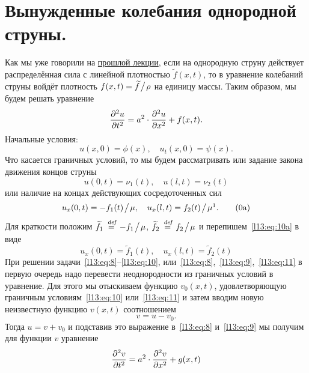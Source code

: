 \section{Вынужденные колебания однородной струны.}
\label{lecture13section2}
Как мы уже говорили на \hyperref[lecture12]{прошлой лекции}, если на однородную струну действует распределённая сила с линейной плотностью $\widetilde{f}(x,t)$, то в уравнение колебаний струны войдёт плотность $f(x,t)=\widetilde{f}\!\bigm/\!\rho$ на единицу массы. Таким образом, мы будем решать уравнение 
\begin{equation}\label{l13:eq:8}
	\frac{\partial^2u}{\partial t^2}=a^2\cdot\frac{\partial^2u}{\partial x^2}+f(x,t).
\end{equation}
Начальные условия:
\begin{equation}\label{l13:eq:9}
	 u(x,0)=\phi(x),\quad u_t(x,0)=\psi(x).
\end{equation}
Что касается граничных условий, то мы будем рассматривать или задание закона движения концов струны
\begin{equation}\label{l13:eq:10}
	 u(0,t)=\nu_1(t),\quad u(l,t)=\nu_2(t)
\end{equation}
или наличие на концах действующих сосредоточенных сил
\begin{equation}\label{l13:eq:10a}
	 u_x(0,t)=-f_1(t)\!\bigm/\!\mu,\quad u_x(l,t)=f_2(t)\!\bigm/\!\mu\footnotemark{}.\tag{\theequation a}
\end{equation} Для краткости положим $\widetilde{f}_1\stackrel{\hspace{0.09 cm}de\!f}{=} -f_1\!\bigm/\!\mu$, $\widetilde{f}_2\stackrel{\hspace{0.09 cm}de\!f}{=} f_2\!\bigm/\!\mu$ и перепишем~\eqref{l13:eq:10a} в виде
\begin{equation}\label{l13:eq:11}
	 u_x(0,t)=\widetilde{f}_1(t),\quad u_x(l,t)=\widetilde{f}_2(t)
\end{equation}
При решении задачи~\eqref{l13:eq:8}--\eqref{l13:eq:10}, или~\eqref{l13:eq:8},~\eqref{l13:eq:9},~\eqref{l13:eq:11} в первую очередь надо перевести неоднородности из граничных условий в уравнение. Для этого мы отыскиваем функцию $v_0(x,t)$, удовлетворяющую граничным условиям~\eqref{l13:eq:10} или~\eqref{l13:eq:11}  и затем вводим новую неизвестную функцию $v(x,t)$ соотношением 
\begin{equation*}
	 v=u-v_0.
\end{equation*}  
Тогда $u=v+v_0$ и подставив это выражение в~\eqref{l13:eq:8} и~\eqref{l13:eq:9} мы получим для функции $v$ уравнение 
\begin{equation}\label{l13:eq:12}
	\frac{\partial^2v}{\partial t^2}=a^2\cdot\frac{\partial^2v}{\partial x^2}+g(x,t)
\end{equation}
